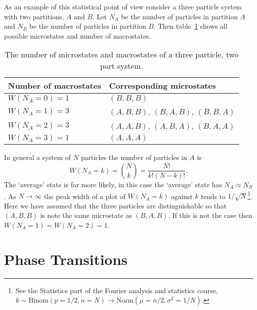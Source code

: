     As an example of this statistical point of view consider a three particle system with two partitions, \(A\) and \(B\).
    Let \(N_A\) be the number of particles in partition \(A\) and \(N_B\) be the number of particles in partition \(B\).
    Then table~\ref{tab:arrangements of three particle, two partition system} shows all possible microstates and number of macrostates.
    \begin{table}[ht]
        \centering
        \begin{tabular}{ll}\hline
            Number of macrostates & Corresponding microstates\\\hline
            \(W(N_A = 0) = 1\) & \((B, B, B)\)\\
            \(W(N_A = 1) = 3\) & \((A, B, B)\), \((B, A, B)\), \((B, B, A)\)\\
            \(W(N_A = 2) = 3\) & \((A, A, B)\), \((A, B, A)\), \((B, A, A)\)\\
            \(W(N_A = 3) = 1\) & \((A, A, A)\)\\\hline
        \end{tabular}
        \caption{The number of microstates and macrostates of a three particle, two part system.}
        \label{tab:arrangements of three particle, two partition system}
    \end{table}
    In general a system of \(N\) particles the number of particles in \(A\) is
    \[W(N_A = k) = {N \choose k} = \frac{N!}{k!(N - k)!}.\]
    The `average' state is far more likely, in this case the `average' state has \(N_A\approx N_B\).
    As \(N\to\infty\) the peak width of a plot of \(W(N_A = k)\) against \(k\) tends to \(1/\sqrt{N}\)\footnote{See the Statistics part of the Fourier analysis and statistics course, \(k\sim\mathrm{Binom}(p=1/2, n=N)\to\mathrm{Norm}(\mu=n/2, \sigma^2=1/N)\).}.
    Here we have assumed that the three particles are distinguishable so that \((A, B, B)\) is note the same microstate as \((B, A, B)\).
    If this is not the case then \(W(N_A = 1) = W(N_A = 2) = 1\).
    
    
    \section{Phase Transitions}
